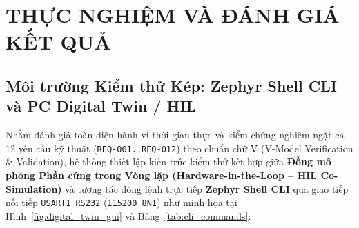 \clearpage
\section{THỰC NGHIỆM VÀ ĐÁNH GIÁ KẾT QUẢ}

\subsection{Môi trường Kiểm thử Kép: Zephyr Shell CLI và PC Digital Twin / HIL}
Nhằm đánh giá toàn diện hành vi thời gian thực và kiểm chứng nghiêm ngặt cả 12 yêu cầu kỹ thuật (\texttt{REQ-001..REQ-012}) theo chuẩn chữ V (V-Model Verification \& Validation), hệ thống thiết lập kiến trúc kiểm thử kết hợp giữa \textbf{Đồng mô phỏng Phần cứng trong Vòng lặp (Hardware-in-the-Loop -- HIL Co-Simulation)} và tương tác dòng lệnh trực tiếp \textbf{Zephyr Shell CLI} qua giao tiếp nối tiếp \texttt{USART1 RS232} (\texttt{115200 8N1}) như minh họa tại Hình~\ref{fig:digital_twin_gui} và Bảng~\ref{tab:cli_commands}:
